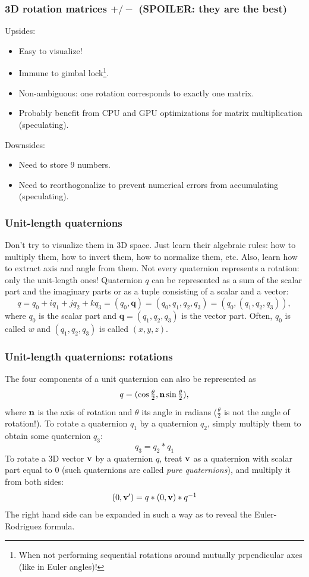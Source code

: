 \documentclass{beamer}
\begin{document}
\begin{frame}
\frametitle{3D rotation matrices $+/-$ (SPOILER: they are the best)}
Upsides:
\begin{itemize}
	\item Easy to visualize!
	\item Immune to gimbal lock\footnote{When not performing sequential rotations around mutually prpendicular axes (like in Euler angles)!}.
	\item Non-ambiguous: one rotation corresponds to exactly one matrix. 
	\item Probably benefit from CPU and GPU optimizations for matrix multiplication (speculating).
\end{itemize}
Downsides:
\begin{itemize}
	\item Need to store 9 numbers.
	\item Need to reorthogonalize to prevent numerical errors from accumulating (speculating). 
\end{itemize}
\end{frame}

\begin{frame}
\frametitle{Unit-length quaternions}
Don't try to visualize them in 3D space. Just learn their algebraic rules: how to multiply them, how to invert them, how to normalize them, etc. Also, learn how to extract axis and angle from them. 
\vfill
Not every quaternion represents a rotation: only the unit-length ones!
\vfill 
Quaternion $q$ can be represented   as a sum of the scalar part and the imaginary parts or as a tuple consisting of a scalar and a vector:
$$
q = q_0 + iq_1 + jq_2 + kq_3 = (q_0, \mathbf{q}) = (q_0, q_1, q_2, q_3) = (q_0, (q_1, q_2, q_3)),
$$
where $q_0$ is the scalar part and $\mathbf{q} = (q_1, q_2, q_3)$ is the vector part.
Often, $q_0$ is called $w$ and $(q_1, q_2, q_3)$ is called $(x,y,z)$.
\end{frame}

\begin{frame}
\frametitle{Unit-length quaternions: rotations}
The four components of a unit quaternion can also be represented as
\begin{equation*}
q = \textstyle(\cos\frac{\theta}{2} , \mathbf{n}\sin\frac{\theta}{2}),
\end{equation*}
where $\mathbf{n}$ is the axis of rotation and $\theta$ its angle in radians ($\frac{\theta}{2}$ is not the angle of rotation!).
\vfill
To rotate a quaternion $q_1$ by a quaternion $q_2$, simply multiply them to obtain some quaternion $q_3$:
$$
q_3 = q_2 * q_1
$$
\vfill
To rotate a 3D vector $\vecsymb{v}$ by a quaternion $q$, treat $\vecsymb{v}$ as a quaternion with scalar part equal to 0 (such quaternions are called \textit{pure quaternions}), and multiply it from both sides:
$$
\quatvec{0}{\vecsymb{v}'} = q * \quatvec{0}{\vecsymb{v}} * q^{-1} 
$$
The right hand side can be expanded in such a way as to reveal the Euler-Rodriguez formula.  
\end{frame}
\end{document}
